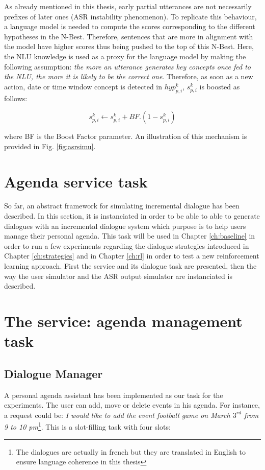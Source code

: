         As already mentioned in this thesis, early partial utterances are not necessarily prefixes of later ones (ASR instability phenomenon). To replicate this behaviour, a language model is needed to compute the scores corresponding to the different hypotheses in the N-Best. Therefore, sentences that are more in alignment with the model have higher scores thus being pushed to the top of this N-Best. Here, the NLU knowledge is used as a proxy for the language model by making the following assumption: \textit{the more an utterance generates key concepts once fed to the NLU, the more it is likely to be the correct one}. Therefore, as soon as a new action, date or time window concept is detected in $hyp^k_{p,i}$, $s^k_{p,i}$ is boosted as follows:
        
        	$$ s^k_{p,i} \leftarrow s^k_{p,i} + BF.(1 - s^k_{p,i}) $$
            
      	where BF is the Boost Factor parameter. An illustration of this mechanism is provided in Fig. \ref{fig:asrsimu}.
				

\section{Agenda service task}

	So far, an abstract framework for simulating incremental dialogue has been described. In this section, it is instanciated in order to be able to able to generate dialogues with an incremental dialogue system which purpose is to help users manage their personal agenda. This task will be used in Chapter \ref{ch:baseline} in order to run a few experiments regarding the dialogue strategies introduced in Chapter \ref{ch:strategies} and in Chapter \ref{ch:rl} in order to test a new reinforcement learning approach. First the service and its dialogue task are presented, then the way the user simulator and the ASR output simulator are instanciated is described.
	
	\section{The service: agenda management task}
	
		\subsection{Dialogue Manager}

			A personal agenda assistant has been implemented as our task for the experiments. The user can add, move or delete events in his agenda. For instance, a request could be: \textit{I would like to add the event football game on March $3^{rd}$ from 9 to 10 pm}\footnote{The dialogues are actually in french but they are translated in English to ensure language coherence in this thesis}. This is a slot-filling task with four slots:
				
